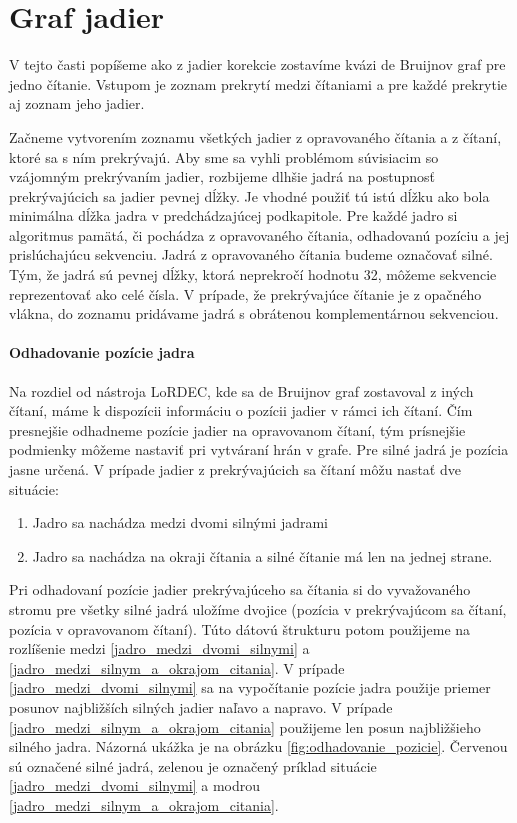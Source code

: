\section{Graf jadier}

V tejto časti popíšeme ako z jadier korekcie zostavíme kvázi de Bruijnov graf pre jedno čítanie. Vstupom je zoznam prekrytí medzi čítaniami a pre každé prekrytie aj zoznam jeho jadier. 

Začneme vytvorením zoznamu všetkých jadier z opravovaného čítania a z čítaní, ktoré sa s ním prekrývajú. Aby sme sa vyhli problémom súvisiacim so vzájomným prekrývaním jadier, rozbijeme dlhšie jadrá na postupnosť prekrývajúcich sa jadier pevnej dĺžky. Je vhodné použiť tú istú dĺžku ako bola minimálna dĺžka jadra v predchádzajúcej podkapitole. Pre každé jadro si algoritmus pamätá, či pochádza z opravovaného čítania, odhadovanú pozíciu a jej prislúchajúcu sekvenciu. Jadrá z opravovaného čítania budeme označovať silné. Tým, že jadrá sú pevnej dĺžky, ktorá neprekročí hodnotu 32, môžeme sekvencie reprezentovať ako celé čísla. V prípade, že prekrývajúce čítanie je z opačného vlákna, do zoznamu pridávame jadrá s obrátenou komplementárnou sekvenciou.

\paragraph{Odhadovanie pozície jadra}

Na rozdiel od nástroja LoRDEC, kde sa de Bruijnov graf zostavoval z iných čítaní, máme k dispozícii informáciu o pozícii jadier v rámci ich čítaní. Čím presnejšie odhadneme pozície jadier na opravovanom čítaní, tým prísnejšie podmienky môžeme nastaviť pri vytváraní hrán v grafe. Pre silné jadrá je pozícia jasne určená. V prípade jadier z prekrývajúcich sa čítaní môžu nastať dve situácie:

\begin{enumerate}[label={S.\arabic*}]
\item \label{jadro_medzi_dvomi_silnymi} Jadro sa nachádza medzi dvomi silnými jadrami
\item \label{jadro_medzi_silnym_a_okrajom_citania} Jadro sa nachádza na okraji čítania a silné čítanie má len na jednej strane.
\end{enumerate}

Pri odhadovaní pozície jadier prekrývajúceho sa čítania si do vyvažovaného stromu pre všetky silné jadrá uložíme dvojice (pozícia v prekrývajúcom sa čítaní, pozícia v opravovanom čítaní). Túto dátovú štrukturu potom použijeme na rozlíšenie medzi \ref{jadro_medzi_dvomi_silnymi} a \ref{jadro_medzi_silnym_a_okrajom_citania}. V prípade \ref{jadro_medzi_dvomi_silnymi} sa na vypočítanie pozície jadra použije priemer posunov najbližších silných jadier naľavo a napravo. V prípade \ref{jadro_medzi_silnym_a_okrajom_citania} použijeme len posun najbližšieho silného jadra. Názorná ukážka je na obrázku \ref{fig:odhadovanie_pozicie}. Červenou sú označené silné jadrá, zelenou je označený príklad situácie \ref{jadro_medzi_dvomi_silnymi} a modrou \ref{jadro_medzi_silnym_a_okrajom_citania}.


